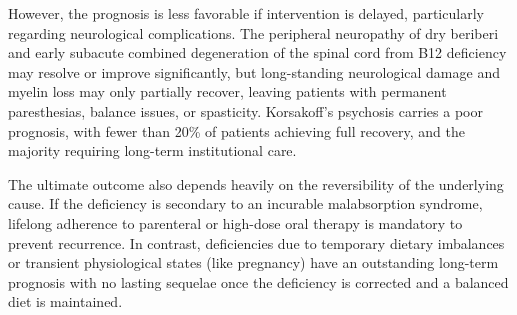 However, the prognosis is less favorable if intervention is delayed, particularly regarding neurological complications. The peripheral neuropathy of dry beriberi and early subacute combined degeneration of the spinal cord from B12 deficiency may resolve or improve significantly, but long-standing neurological damage and myelin loss may only partially recover, leaving patients with permanent paresthesias, balance issues, or spasticity. Korsakoff's psychosis carries a poor prognosis, with fewer than 20\% of patients achieving full recovery, and the majority requiring long-term institutional care.

The ultimate outcome also depends heavily on the reversibility of the underlying cause. If the deficiency is secondary to an incurable malabsorption syndrome, lifelong adherence to parenteral or high-dose oral therapy is mandatory to prevent recurrence. In contrast, deficiencies due to temporary dietary imbalances or transient physiological states (like pregnancy) have an outstanding long-term prognosis with no lasting sequelae once the deficiency is corrected and a balanced diet is maintained.

